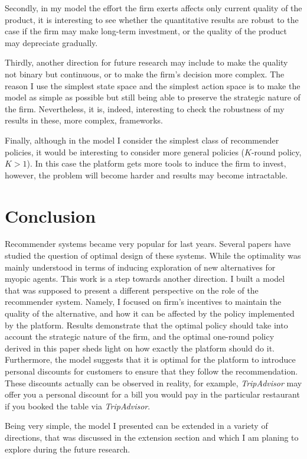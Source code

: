 \documentclass[a4paper]{article}
\begin{document}
Secondly, in my model the effort the firm exerts affects only current quality of the product, it is interesting to see whether the quantitative results are robust to the case if the firm may make long-term investment, or the quality of the product may depreciate gradually.



Thirdly, another direction for future research may include to make the quality not binary but continuous, or to make the firm's decision more complex. The reason I use the simplest state space and the simplest action space is to make the model as simple as possible but still being able to preserve the strategic nature of the firm. Nevertheless, it is, indeed, interesting to check the robustness of my results in these, more complex, frameworks.


Finally, although in the model I consider the simplest class of recommender policies, it would be interesting to consider more general policies ($K$-round policy, $K > 1$). In this case the platform gets more tools to induce the firm to invest, however, the problem will become harder and results may become intractable.
\section{Conclusion}
Recommender systems became very popular for last years. Several papers have studied the question of optimal design of these systems. While the optimality was mainly understood in terms of inducing exploration of new alternatives for myopic agents. This work is a step towards another direction. I built a model that was supposed to present a different perspective on the role of the recommender system. Namely, I focused on firm's incentives to maintain the quality of the alternative, and how it can be affected by the policy implemented by the platform. Results demonstrate that the optimal policy should take into account the strategic nature of the firm, and the optimal one-round policy derived in this paper sheds light on how exactly the platform should do it. Furthermore, the model suggests that it is optimal for the platform to introduce personal discounts for customers to ensure that they follow the recommendation. These discounts actually can be observed in reality, for example, \textit{TripAdvisor} may offer you a personal discount for a bill you would pay in the particular restaurant if you booked the table via \textit{TripAdvisor}.


Being very simple, the model I presented can be extended in a variety of directions, that was discussed in the extension section and which I am planing to explore during the future research.


\newpage
{}
%

\end{document}
